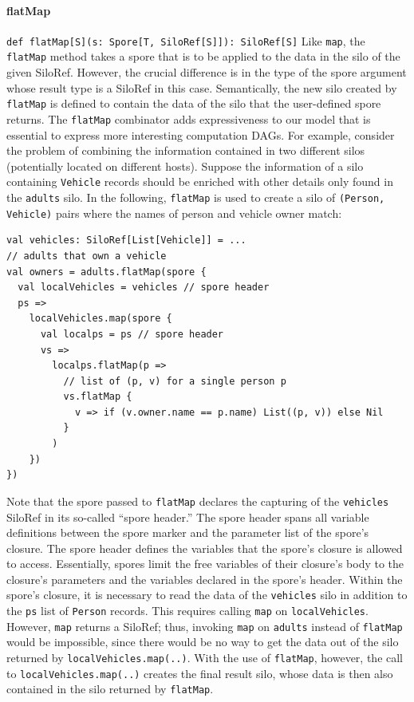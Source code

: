 \documentclass[preprint]{sigplanconf}
\theoremstyle{definition}
\theoremstyle{definition}
\begin{document}
\paragraph{flatMap} \texttt{def flatMap[S](s: Spore[T, SiloRef[S]]): SiloRef[S]}
\newline Like \verb|map|, the \verb|flatMap| method takes a spore that is to
be applied to the data in the silo of the given SiloRef. However, the crucial
difference is in the type of the spore argument whose result type is a SiloRef
in this case. Semantically, the new silo created by \verb|flatMap| is defined
to contain the data of the silo that the user-defined spore returns. The
\verb|flatMap| combinator adds expressiveness to our model that is essential
to express more interesting computation DAGs. For example, consider the
problem of combining the information contained in two different silos
(potentially located on different hosts). Suppose the information of a silo
containing \verb|Vehicle| records should be enriched with other details only
found in the \verb|adults| silo. In the following, \verb|flatMap| is used to
create a silo of \verb|(Person, Vehicle)| pairs where the names of person and
vehicle owner match:

\begin{lstlisting}
val vehicles: SiloRef[List[Vehicle]] = ...
// adults that own a vehicle
val owners = adults.flatMap(spore {
  val localVehicles = vehicles // spore header
  ps =>
    localVehicles.map(spore {
      val localps = ps // spore header
      vs =>
        localps.flatMap(p =>
          // list of (p, v) for a single person p
          vs.flatMap {
            v => if (v.owner.name == p.name) List((p, v)) else Nil
          }
        )
    })
})
\end{lstlisting}
\noindent
Note that the spore passed to \verb|flatMap| declares the capturing of the
\verb|vehicles| SiloRef in its so-called ``spore header.'' The spore header
spans all variable definitions between the spore marker and the parameter list
of the spore's closure. The spore header defines the variables that the
spore's closure is allowed to access. Essentially, spores limit the free
variables of their closure's body to the closure's parameters and the
variables declared in the spore's header. Within the spore's closure, it is
necessary to read the data of the \verb|vehicles| silo in addition to the
\verb|ps| list of \verb|Person| records. This requires calling \verb|map| on \verb|localVehicles|.
However, \verb|map| returns a SiloRef; thus, invoking \verb|map| on
\verb|adults| instead of \verb|flatMap| would be impossible, since there would
be no way to get the data out of the silo returned by
\verb|localVehicles.map(..)|. With the use of \verb|flatMap|, however, the
call to \verb|localVehicles.map(..)| creates the final result silo, whose data
is then also contained in the silo returned by \verb|flatMap|.
\end{document}
